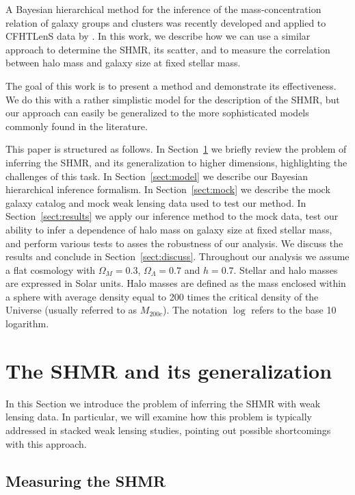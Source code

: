 \documentclass[usenatbib]{mnras}
\def\Sref#1{Section~\ref{#1}\xspace}
\begin{document}
A Bayesian hierarchical method for the inference of the mass-concentration relation of galaxy groups and clusters was recently developed and applied to CFHTLenS data by \citet{Lie++17}. 
In this work, we describe how we can use a similar approach to determine the SHMR, its scatter, and to measure the correlation between halo mass and galaxy size at fixed stellar mass.

The goal of this work is to present a method and demonstrate its effectiveness. We do this with a rather simplistic model for the description of the SHMR, but our approach can easily be generalized to the more sophisticated models commonly found in the literature.

This paper is structured as follows. In \Sref{sect:shmr} we briefly review the problem of inferring the SHMR, and its generalization to higher dimensions, highlighting the challenges of this task. 
In \Sref{sect:model} we describe our Bayesian hierarchical inference formalism. 
In \Sref{sect:mock} we describe the mock galaxy catalog and mock weak lensing data used to test our method.
In \Sref{sect:results} we apply our inference method to the mock data, test our ability to infer a dependence of halo mass on galaxy size at fixed stellar mass, and perform various tests to asses the robustness of our analysis. We discuss the results and conclude in \Sref{sect:discuss}.
Throughout our analysis we assume a flat cosmology with $\Omega_M=0.3$, $\Omega_\Lambda=0.7$ and $h=0.7$. Stellar and halo masses are expressed in Solar units. Halo masses are defined as the mass enclosed within a sphere with average density equal to 200 times the critical density of the Universe (usually referred to as $M_{200c}$). The notation $\log{}$ refers to the base 10 logarithm.



\section{The SHMR and its generalization}\label{sect:shmr}

In this Section we introduce the problem of inferring the SHMR with weak lensing data. In particular, we will examine how this problem is typically addressed in stacked weak lensing studies, pointing out possible shortcomings with this approach.

\subsection{Measuring the SHMR}
\end{document}
